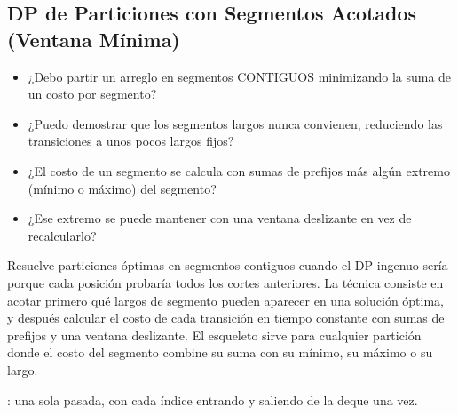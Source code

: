 \subsection{DP de Particiones con Segmentos Acotados (Ventana Mínima)}
\label{alg:6-9}


\begin{itemize}
\item ¿Debo partir un arreglo en segmentos CONTIGUOS minimizando la suma de un costo por segmento?
\item ¿Puedo demostrar que los segmentos largos nunca convienen, reduciendo las transiciones a unos pocos largos fijos?
\item ¿El costo de un segmento se calcula con sumas de prefijos más algún extremo (mínimo o máximo) del segmento?
\item ¿Ese extremo se puede mantener con una ventana deslizante en vez de recalcularlo?
\end{itemize}

 Resuelve particiones óptimas en segmentos contiguos cuando el DP ingenuo sería  porque cada posición probaría todos los cortes anteriores. La técnica consiste en acotar primero qué largos de segmento pueden aparecer en una solución óptima, y después calcular el costo de cada transición en tiempo constante con sumas de prefijos y una ventana deslizante. El esqueleto sirve para cualquier partición donde el costo del segmento combine su suma con su mínimo, su máximo o su largo.

 : una sola pasada, con cada índice entrando y saliendo de la deque una vez.

